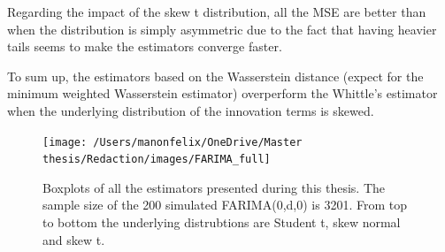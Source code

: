 \documentclass[
  11pt,
]{article}
\begin{document}
Regarding the impact of the skew t distribution, all the MSE are better
than when the distribution is simply asymmetric due to the fact that
having heavier tails seems to make the estimators converge faster.

To sum up, the estimators based on the Wasserstein distance (expect for
the minimum weighted Wasserstein estimator) overperform the Whittle's
estimator when the underlying distribution of the innovation terms is
skewed.

\begin{figure}

{\centering \texttt{[image: /Users/manonfelix/OneDrive/Master thesis/Redaction/images/FARIMA\_full]} 

}

\caption{Boxplots of all the estimators presented during this thesis. The sample size of the 200 simulated FARIMA(0,d,0) is 3201. From top to bottom the underlying distrubtions are Student t, skew normal and skew t.}\label{fig:box_farima_full}
\end{figure}
\end{document}

